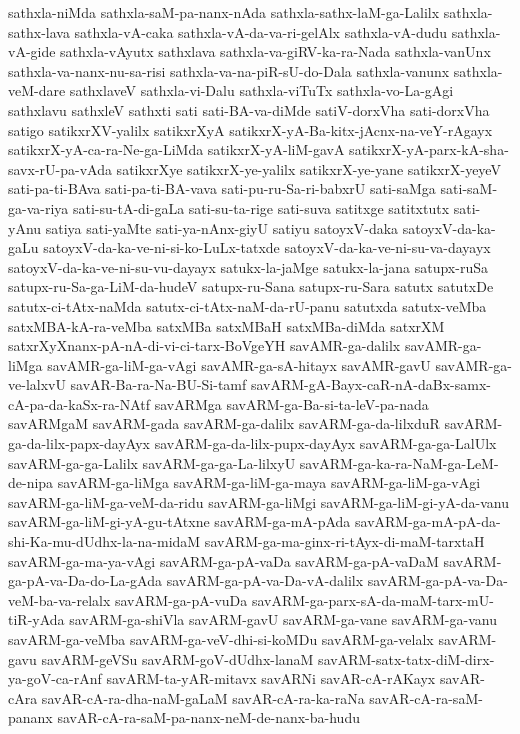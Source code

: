 {sathxla-niMda
sathxla-saM-pa-nanx-nAda
sathxla-sathx-laM-ga-Lalilx
sathxla-sathx-lava
sathxla-vA-caka
sathxla-vA-da-va-ri-gelAlx
sathxla-vA-dudu
sathxla-vA-gide
sathxla-vAyutx
sathxlava
sathxla-va-giRV-ka-ra-Nada
sathxla-vanUnx
sathxla-va-nanx-nu-sa-risi
sathxla-va-na-piR-sU-do-Dala
sathxla-vanunx
sathxla-veM-dare
sathxlaveV
sathxla-vi-Dalu
sathxla-viTuTx
sathxla-vo-La-gAgi
sathxlavu
sathxleV
sathxti
sati
sati-BA-va-diMde
satiV-dorxVha
sati-dorxVha
satigo
satikxrXV-yalilx
satikxrXyA
satikxrX-yA-Ba-kitx-jAcnx-na-veY-rAgayx
satikxrX-yA-ca-ra-Ne-ga-LiMda
satikxrX-yA-liM-gavA
satikxrX-yA-parx-kA-sha-savx-rU-pa-vAda
satikxrXye
satikxrX-ye-yalilx
satikxrX-ye-yane
satikxrX-yeyeV
sati-pa-ti-BAva
sati-pa-ti-BA-vava
sati-pu-ru-Sa-ri-babxrU
sati-saMga
sati-saM-ga-va-riya
sati-su-tA-di-gaLa
sati-su-ta-rige
sati-suva
satitxge
satitxtutx
sati-yAnu
satiya
sati-yaMte
sati-ya-nAnx-giyU
satiyu
satoyxV-daka
satoyxV-da-ka-gaLu
satoyxV-da-ka-ve-ni-si-ko-LuLx-tatxde
satoyxV-da-ka-ve-ni-su-va-dayayx
satoyxV-da-ka-ve-ni-su-vu-dayayx
satukx-la-jaMge
satukx-la-jana
satupx-ruSa
satupx-ru-Sa-ga-LiM-da-hudeV
satupx-ru-Sana
satupx-ru-Sara
satutx
satutxDe
satutx-ci-tAtx-naMda
satutx-ci-tAtx-naM-da-rU-panu
satutxda
satutx-veMba
satxMBA-kA-ra-veMba
satxMBa
satxMBaH
satxMBa-diMda
satxrXM
satxrXyXnanx-pA-nA-di-vi-ci-tarx-BoVgeYH
savAMR-ga-dalilx
savAMR-ga-liMga
savAMR-ga-liM-ga-vAgi
savAMR-ga-sA-hitayx
savAMR-gavU
savAMR-ga-ve-lalxvU
savAR-Ba-ra-Na-BU-Si-tamf
savARM-gA-Bayx-caR-nA-daBx-samx-cA-pa-da-kaSx-ra-NAtf
savARMga
savARM-ga-Ba-si-ta-leV-pa-nada
savARMgaM
savARM-gada
savARM-ga-dalilx
savARM-ga-da-lilxduR
savARM-ga-da-lilx-papx-dayAyx
savARM-ga-da-lilx-pupx-dayAyx
savARM-ga-ga-LalUlx
savARM-ga-ga-Lalilx
savARM-ga-ga-La-lilxyU
savARM-ga-ka-ra-NaM-ga-LeM-de-nipa
savARM-ga-liMga
savARM-ga-liM-ga-maya
savARM-ga-liM-ga-vAgi
savARM-ga-liM-ga-veM-da-ridu
savARM-ga-liMgi
savARM-ga-liM-gi-yA-da-vanu
savARM-ga-liM-gi-yA-gu-tAtxne
savARM-ga-mA-pAda
savARM-ga-mA-pA-da-shi-Ka-mu-dUdhx-la-na-midaM
savARM-ga-ma-ginx-ri-tAyx-di-maM-tarxtaH
savARM-ga-ma-ya-vAgi
savARM-ga-pA-vaDa
savARM-ga-pA-vaDaM
savARM-ga-pA-va-Da-do-La-gAda
savARM-ga-pA-va-Da-vA-dalilx
savARM-ga-pA-va-Da-veM-ba-va-relalx
savARM-ga-pA-vuDa
savARM-ga-parx-sA-da-maM-tarx-mU-tiR-yAda
savARM-ga-shiVla
savARM-gavU
savARM-ga-vane
savARM-ga-vanu
savARM-ga-veMba
savARM-ga-veV-dhi-si-koMDu
savARM-ga-velalx
savARM-gavu
savARM-geVSu
savARM-goV-dUdhx-lanaM
savARM-satx-tatx-diM-dirx-ya-goV-ca-rAnf
savARM-ta-yAR-mitavx
savARNi
savAR-cA-rAKayx
savAR-cAra
savAR-cA-ra-dha-naM-gaLaM
savAR-cA-ra-ka-raNa
savAR-cA-ra-saM-pananx
savAR-cA-ra-saM-pa-nanx-neM-de-nanx-ba-hudu
}
